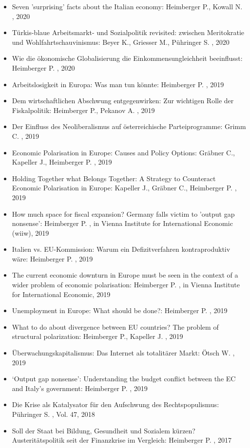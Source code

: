 \begin{itemize}
\item Seven ’surprising’ facts about the Italian economy: Heimberger P., Kowall N. , 2020
\item Türkis-blaue Arbeitsmarkt- und Sozialpolitik revisited: zwischen Meritokratie und Wohlfahrtschauvinismus: Beyer K., Griesser M., Pühringer S. , 2020
\item Wie die ökonomische Globalisierung die Einkommensungleichheit beeinflusst: Heimberger P. , 2020
\item Arbeitslosigkeit in Europa: Was man tun könnte: Heimberger P. , 2019
\item Dem wirtschaftlichen Abschwung entgegenwirken: Zur wichtigen Rolle der Fiskalpolitik: Heimberger P., Pekanov A. , 2019
\item Der Einfluss des Neoliberalismus auf österreichische Parteiprogramme: Grimm C. , 2019
\item Economic Polarisation in Europe: Causes and Policy Options: Gräbner C., Kapeller J., Heimberger P. , 2019
\item Holding Together what Belongs Together: A Strategy to Counteract Economic Polarisation in Europe: Kapeller J., Gräbner C., Heimberger P. , 2019
\item How much space for fiscal expansion? Germany falls victim to 'output gap nonsense’: Heimberger P. , in Vienna Institute for International Economic (wiiw), 2019
\item Italien vs. EU-Kommission: Warum ein Defizitverfahren kontraproduktiv wäre: Heimberger P. , 2019
\item The current economic downturn in Europe must be seen in the context of a wider problem of economic polarisation: Heimberger P. , in Vienna Institute for International Economic, 2019
\item Unemployment in Europe: What should be done?: Heimberger P. , 2019
\item What to do about divergence between EU countries? The problem of structural polarization: Heimberger P., Kapeller J. , 2019
\item Überwachungskapitalismus: Das Internet als totalitärer Markt: Ötsch W. , 2019
\item ‘Output gap nonsense': Understanding the budget conflict between the EC and Italy’s government: Heimberger P. , 2019
\item Die Krise als Katalysator für den Aufschwung des Rechtspopulismus: Pühringer S. , Vol. 47, 2018
\item Soll der Staat bei Bildung, Gesundheit und Sozialem kürzen? Austeritätspolitik seit der Finanzkrise im Vergleich: Heimberger P. , 2017

\end{itemize}
